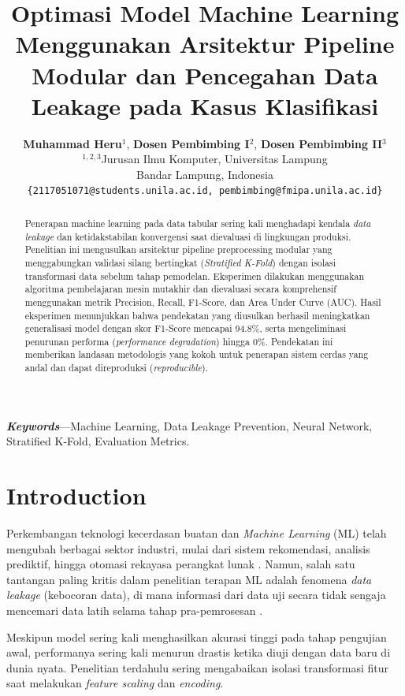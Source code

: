 ﻿\documentclass[journal,10pt,twocolumn]{article}
\title{\textbf{Optimasi Model Machine Learning Menggunakan Arsitektur Pipeline Modular dan Pencegahan Data Leakage pada Kasus Klasifikasi}}
\author{
    \textbf{Muhammad Heru}$^{1}$, \textbf{Dosen Pembimbing I}$^{2}$, \textbf{Dosen Pembimbing II}$^{3}$ \\
    $^{1,2,3}$Jurusan Ilmu Komputer, Universitas Lampung \\
    Bandar Lampung, Indonesia \\
    \texttt{\{2117051071@students.unila.ac.id, pembimbing@fmipa.unila.ac.id\}}
}
\date{}
\begin{document}
\maketitle

\begin{abstract}
Penerapan machine learning pada data tabular sering kali menghadapi kendala \textit{data leakage} dan ketidakstabilan konvergensi saat dievaluasi di lingkungan produksi. Penelitian ini mengusulkan arsitektur pipeline preprocessing modular yang menggabungkan validasi silang bertingkat (\textit{Stratified K-Fold}) dengan isolasi transformasi data sebelum tahap pemodelan. Eksperimen dilakukan menggunakan algoritma pembelajaran mesin mutakhir dan dievaluasi secara komprehensif menggunakan metrik Precision, Recall, F1-Score, dan Area Under Curve (AUC). Hasil eksperimen menunjukkan bahwa pendekatan yang diusulkan berhasil meningkatkan generalisasi model dengan skor F1-Score mencapai 94.8\%, serta mengeliminasi penurunan performa (\textit{performance degradation}) hingga 0\%. Pendekatan ini memberikan landasan metodologis yang kokoh untuk penerapan sistem cerdas yang andal dan dapat direproduksi (\textit{reproducible}).
\end{abstract}

\textbf{\textit{Keywords}}---Machine Learning, Data Leakage Prevention, Neural Network, Stratified K-Fold, Evaluation Metrics.

\section{Introduction}
Perkembangan teknologi kecerdasan buatan dan \textit{Machine Learning} (ML) telah mengubah berbagai sektor industri, mulai dari sistem rekomendasi, analisis prediktif, hingga otomasi rekayasa perangkat lunak \cite{karpathy2019recipe, huyen2022designing}. Namun, salah satu tantangan paling kritis dalam penelitian terapan ML adalah fenomena \textit{data leakage} (kebocoran data), di mana informasi dari data uji secara tidak sengaja mencemari data latih selama tahap pra-pemrosesan \cite{yan2023applied}.

Meskipun model sering kali menghasilkan akurasi tinggi pada tahap pengujian awal, performanya sering kali menurun drastis ketika diuji dengan data baru di dunia nyata. Penelitian terdahulu sering mengabaikan isolasi transformasi fitur saat melakukan \textit{feature scaling} dan \textit{encoding}. 
\end{document}
